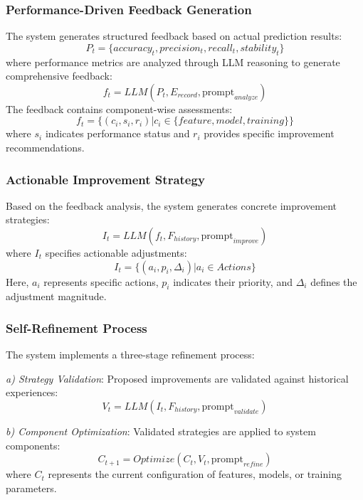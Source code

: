 \documentclass[conference]{IEEEtran}
\begin{document}
\subsubsection{Performance-Driven Feedback Generation}
The system generates structured feedback based on actual prediction results:
\begin{equation}
    P_t = \{accuracy_t, precision_t, recall_t, stability_t\}
\end{equation}
where performance metrics are analyzed through LLM reasoning to generate comprehensive feedback:
\begin{equation}
    f_t = LLM(P_t, E_{record}, \text{prompt}_{analyze})
\end{equation}
The feedback contains component-wise assessments:
\begin{equation}
    f_t = \{(c_i, s_i, r_i) | c_i \in \{feature, model, training\}\}
\end{equation}
where $s_i$ indicates performance status and $r_i$ provides specific improvement recommendations.

\subsubsection{Actionable Improvement Strategy}
Based on the feedback analysis, the system generates concrete improvement strategies:
\begin{equation}
    I_t = LLM(f_t, F_{history}, \text{prompt}_{improve})
\end{equation}
where $I_t$ specifies actionable adjustments:
\begin{equation}
    I_t = \{(a_i, p_i, \Delta_i) | a_i \in Actions\}
\end{equation}
Here, $a_i$ represents specific actions, $p_i$ indicates their priority, and $\Delta_i$ defines the adjustment magnitude.

\subsubsection{Self-Refinement Process}
The system implements a three-stage refinement process:

\textit{a) Strategy Validation}: Proposed improvements are validated against historical experiences:
\begin{equation}
    V_t = LLM(I_t, F_{history}, \text{prompt}_{validate})
\end{equation}

\textit{b) Component Optimization}: Validated strategies are applied to system components:
\begin{equation}
    C_{t+1} = Optimize(C_t, V_t, \text{prompt}_{refine})
\end{equation}
where $C_t$ represents the current configuration of features, models, or training parameters.
\end{document}
